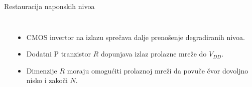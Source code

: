 \begin{frame}[label=09_3-s056]{Restauracija naponskih nivoa}
\begin{columns}[c,onlytextwidth]
\begin{center}

\end{center}
\begin{itemize}
\item CMOS invertor na izlazu sprečava dalje prenošenje degradiranih nivoa.
\item Dodatni P tranzistor $R$ dopunjava izlaz prolazne mreže do $V_{DD}$.
\item Dimenzije $R$ moraju omogućiti prolaznoj mreži da povuče čvor dovoljno nisko i zakoči $N$.
\end{itemize}
\end{columns}
\end{frame}
